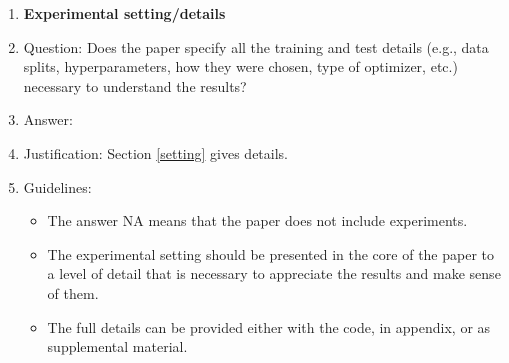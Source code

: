 \documentclass{article}
\begin{document}
\begin{enumerate}
\item {\bf Experimental setting/details}
    \item[] Question: Does the paper specify all the training and test details (e.g., data splits, hyperparameters, how they were chosen, type of optimizer, etc.) necessary to understand the results?
    \item[] Answer: \answerYes{} %
    \item[] Justification: Section \ref{setting} gives details.
    \item[] Guidelines:
    \begin{itemize}
        \item The answer NA means that the paper does not include experiments.
        \item The experimental setting should be presented in the core of the paper to a level of detail that is necessary to appreciate the results and make sense of them.
        \item The full details can be provided either with the code, in appendix, or as supplemental material.
    \end{itemize}


\end{enumerate}
\end{document}
